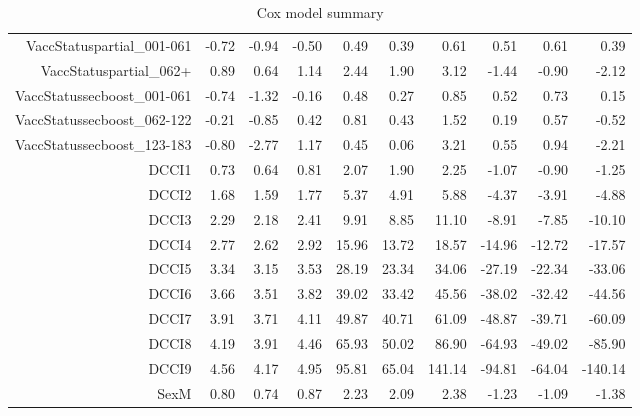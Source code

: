 \begin{table}[ht]
\begin{tabular}{rrrrrrrrrr}
  VaccStatuspartial\_001-061 & -0.72 & -0.94 & -0.50 & 0.49 & 0.39 & 0.61 & 0.51 & 0.61 & 0.39 \\ 
  VaccStatuspartial\_062+ & 0.89 & 0.64 & 1.14 & 2.44 & 1.90 & 3.12 & -1.44 & -0.90 & -2.12 \\ 
  VaccStatussecboost\_001-061 & -0.74 & -1.32 & -0.16 & 0.48 & 0.27 & 0.85 & 0.52 & 0.73 & 0.15 \\ 
  VaccStatussecboost\_062-122 & -0.21 & -0.85 & 0.42 & 0.81 & 0.43 & 1.52 & 0.19 & 0.57 & -0.52 \\ 
  VaccStatussecboost\_123-183 & -0.80 & -2.77 & 1.17 & 0.45 & 0.06 & 3.21 & 0.55 & 0.94 & -2.21 \\ 
  DCCI1 & 0.73 & 0.64 & 0.81 & 2.07 & 1.90 & 2.25 & -1.07 & -0.90 & -1.25 \\ 
  DCCI2 & 1.68 & 1.59 & 1.77 & 5.37 & 4.91 & 5.88 & -4.37 & -3.91 & -4.88 \\ 
  DCCI3 & 2.29 & 2.18 & 2.41 & 9.91 & 8.85 & 11.10 & -8.91 & -7.85 & -10.10 \\ 
  DCCI4 & 2.77 & 2.62 & 2.92 & 15.96 & 13.72 & 18.57 & -14.96 & -12.72 & -17.57 \\ 
  DCCI5 & 3.34 & 3.15 & 3.53 & 28.19 & 23.34 & 34.06 & -27.19 & -22.34 & -33.06 \\ 
  DCCI6 & 3.66 & 3.51 & 3.82 & 39.02 & 33.42 & 45.56 & -38.02 & -32.42 & -44.56 \\ 
  DCCI7 & 3.91 & 3.71 & 4.11 & 49.87 & 40.71 & 61.09 & -48.87 & -39.71 & -60.09 \\ 
  DCCI8 & 4.19 & 3.91 & 4.46 & 65.93 & 50.02 & 86.90 & -64.93 & -49.02 & -85.90 \\ 
  DCCI9 & 4.56 & 4.17 & 4.95 & 95.81 & 65.04 & 141.14 & -94.81 & -64.04 & -140.14 \\ 
  SexM & 0.80 & 0.74 & 0.87 & 2.23 & 2.09 & 2.38 & -1.23 & -1.09 & -1.38 \\ 
   \hline
\end{tabular}
\caption{Cox model summary} 
\end{table}
